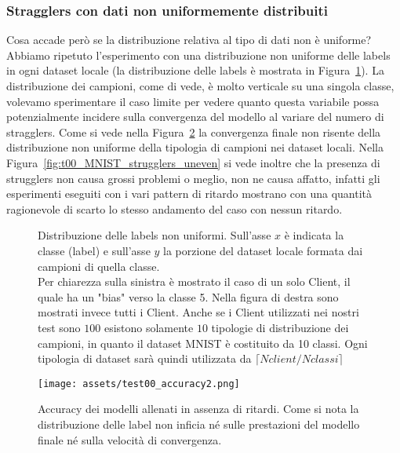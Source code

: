 \documentclass[a4paper, oneside, openright]{report}
\begin{document}
\subsubsection*{Stragglers con dati non uniformemente distribuiti}
Cosa accade però se la distribuzione relativa al tipo di dati non è uniforme? Abbiamo ripetuto l'esperimento con una distribuzione non uniforme delle labels in ogni dataset locale (la distribuzione delle labels è mostrata in Figura~\ref{fig:uneven_distr}).
La distribuzione dei campioni, come di vede, è molto verticale su una singola classe, volevamo sperimentare il caso limite per vedere quanto questa variabile possa potenzialmente incidere sulla convergenza del modello al variare del numero di stragglers. Come si vede nella Figura~\ref{fig:t00_acc} la convergenza finale non risente della distribuzione non uniforme della tipologia di campioni nei dataset locali. Nella Figura~\ref{fig:t00_MNIST_strugglers_uneven} si vede inoltre che la presenza di strugglers non causa grossi problemi o meglio, non ne causa affatto, infatti gli esperimenti eseguiti con i vari pattern di ritardo mostrano con una quantità ragionevole di scarto lo stesso andamento del caso con nessun ritardo.

\begin{figure}[h!]
    \centering
    \qquad
    \caption{Distribuzione delle labels non uniformi. Sull'asse $x$ è indicata la classe (label) e sull'asse $y$ la porzione del dataset locale formata dai campioni di quella classe. \\
    Per chiarezza sulla sinistra è mostrato il caso di un solo Client, il quale ha un "bias" verso la classe 5. Nella figura di destra sono mostrati invece tutti i Client. Anche se i Client utilizzati nei nostri test sono $100$ esistono solamente $10$ tipologie di distribuzione dei campioni, in quanto il dataset MNIST è costituito da 10 classi. Ogni tipologia di dataset sarà quindi utilizzata da $\lceil Nclient/Nclassi \rceil$}
    \label{fig:uneven_distr}
\end{figure}


\begin{figure}[h!]
\centering
\texttt{[image: assets/test00\_accuracy2.png]}
\caption{Accuracy dei modelli allenati in assenza di ritardi. Come si nota la distribuzione delle label non inficia né sulle prestazioni del modello finale né sulla velocità di convergenza.}\label{fig:t00_acc}
\end{figure}
\end{document}

